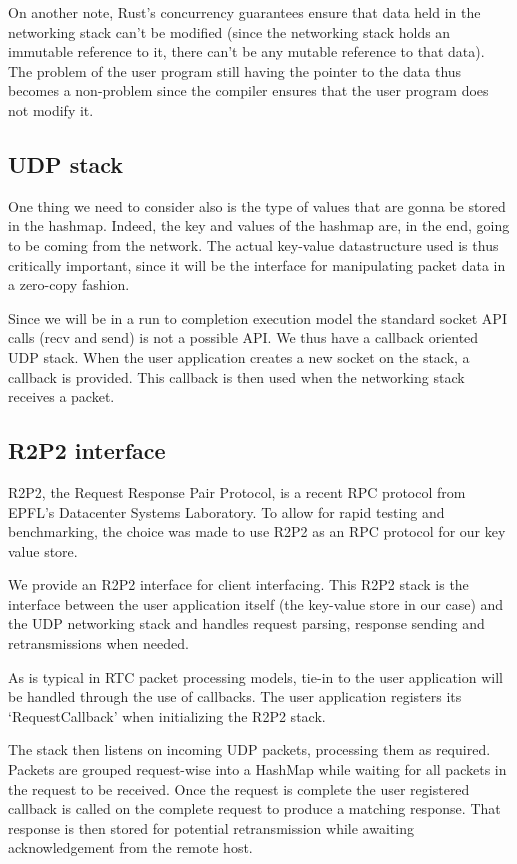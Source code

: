 \documentclass[11pt]{article}
\begin{document}
On another note, Rust's concurrency guarantees ensure that data held
in the networking stack can't be modified (since the networking stack
holds an immutable reference to it, there can't be any mutable
reference to that data). The problem of the user program still having
the pointer to the data thus becomes a non-problem since the compiler
ensures that the user program does not modify it.

\subsection{UDP stack}

One thing we need to consider also is the type of values that are
gonna be stored in the hashmap. Indeed, the key and values of the
hashmap are, in the end, going to be coming from the network. The
actual key-value datastructure used is thus critically important,
since it will be the interface for manipulating packet data in a
zero-copy fashion.

Since we will be in a run to completion execution model the standard
socket API calls (recv and send) is not a possible API\@. We thus have
a callback oriented UDP stack. When the user application creates a
new socket on the stack, a callback is provided. This callback is then
used when the networking stack receives a packet.

\subsection{R2P2 interface}

R2P2, the Request Response Pair Protocol, is a recent RPC protocol
from EPFL's Datacenter Systems Laboratory. To allow for rapid testing
and benchmarking, the choice was made to use R2P2 as an RPC protocol
for our key value store.

We provide an R2P2 interface for client interfacing. This R2P2 stack
is the interface between the user application itself (the key-value
store in our case) and the UDP networking stack and handles request
parsing, response sending and retransmissions when needed.

As is typical in RTC packet processing models, tie-in to the user
application will be handled through the use of callbacks. The user
application registers its `RequestCallback' when initializing the R2P2
stack.

The stack then listens on incoming UDP packets, processing them as
required. Packets are grouped request-wise into a HashMap while
waiting for all packets in the request to be received. Once the
request is complete the user registered callback is called on the
complete request to produce a matching response. That response is then
stored for potential retransmission while awaiting acknowledgement
from the remote host.
\end{document}
